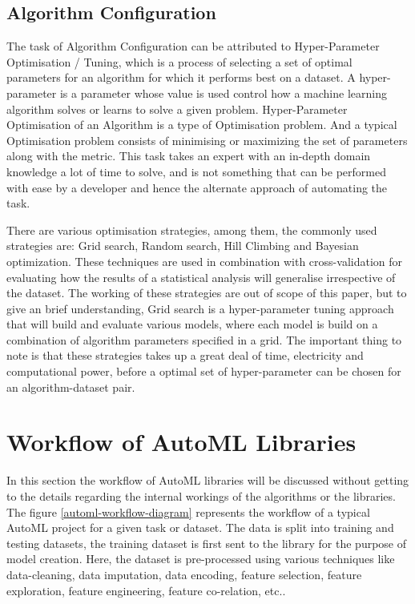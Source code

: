 \subsection{Algorithm Configuration}

The task of Algorithm Configuration can be attributed to Hyper-Parameter Optimisation / Tuning, which is a process of selecting a set of optimal parameters for an algorithm for which it performs best on a dataset. A hyper-parameter is a parameter whose value is used control how a machine learning algorithm solves or learns to solve a given problem. Hyper-Parameter Optimisation of an Algorithm is a type of Optimisation problem. And a typical Optimisation problem consists of minimising or maximizing the set of parameters along with the metric. This task takes an expert with an in-depth domain knowledge a lot of time to solve, and is not something that can be performed with ease by a developer and hence the alternate approach of automating the task.

There are various optimisation strategies, among them, the commonly used strategies are: Grid search, Random search, Hill Climbing and Bayesian optimization. These techniques are used in combination with cross-validation for evaluating how the results of a statistical analysis will generalise irrespective of the dataset. The working of these strategies are out of scope of this paper, but to give an brief understanding, Grid search is a hyper-parameter tuning approach that will build and evaluate various models, where each model is build on a combination of algorithm parameters specified in a grid. The important thing to note is that these strategies takes up a great deal of time, electricity and computational power, before a optimal set of hyper-parameter can be chosen for an algorithm-dataset pair.

\section{Workflow of AutoML Libraries}
\label{workflow-automl}

In this section the workflow of AutoML libraries will be discussed without getting to the details regarding the internal workings of the algorithms or the libraries. The figure \ref{automl-workflow-diagram} represents the workflow of a typical AutoML project for a given task or dataset. The data is split into training and testing datasets, the training dataset is first sent to the library for the purpose of model creation. Here, the dataset is pre-processed using various techniques like data-cleaning, data imputation, data encoding, feature selection, feature exploration, feature engineering, feature co-relation, etc..

